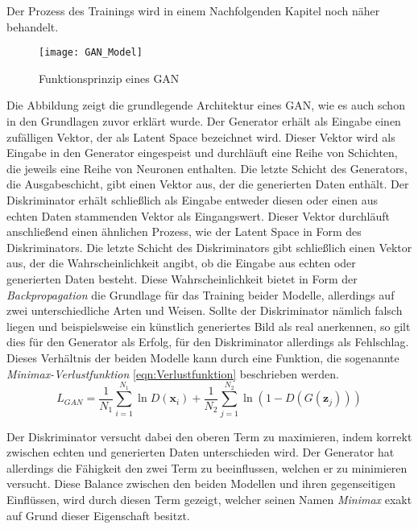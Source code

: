 \noindent Der Prozess des Trainings wird in einem Nachfolgenden Kapitel noch näher behandelt. 

\newpage

\begin{figure}[h]
    \centering
    \texttt{[image: GAN\_Model]}
    \caption{Funktionsprinzip eines \ac{GAN}}
    \label{Abb:basic}
    \end{figure}

    \noindent Die Abbildung zeigt die grundlegende Architektur eines \ac{GAN}, wie es auch schon in den Grundlagen zuvor erklärt wurde. Der Generator erhält als Eingabe einen zufälligen Vektor, der als Latent Space bezeichnet wird. Dieser Vektor wird als Eingabe in den Generator eingespeist und durchläuft eine Reihe von Schichten, die jeweils eine Reihe von Neuronen enthalten. Die letzte Schicht des Generators, die Ausgabeschicht, gibt einen Vektor aus, der die generierten Daten enthält. Der Diskriminator erhält schließlich als Eingabe entweder diesen oder einen aus echten Daten stammenden Vektor als Eingangswert. Dieser Vektor durchläuft anschließend einen ähnlichen Prozess, wie der Latent Space in Form des Diskriminators. Die letzte Schicht des Diskriminators gibt schließlich einen Vektor aus, der die Wahrscheinlichkeit angibt, ob die Eingabe aus echten oder generierten Daten besteht. Diese Wahrscheinlichkeit bietet in Form der \textit{Backpropagation} die Grundlage für das Training beider Modelle, allerdings auf zwei unterschiedliche Arten und Weisen. Sollte der Diskriminator nämlich falsch liegen und beispielsweise ein künstlich generiertes Bild als real anerkennen, so gilt dies für den Generator als Erfolg, für den Diskriminator allerdings als Fehlschlag. Dieses Verhältnis der beiden Modelle kann durch eine Funktion, die sogenannte \textit{Minimax-Verlustfunktion} \ref{eqn:Verlustfunktion} beschrieben werden.\\

    \begin{equation}
        \label{eqn:Verlustfunktion}
        L_{GAN}=\frac{1}{N_1}\sum_{i=1}^{N_1} \ln{D (\textbf{x}_i)} + \frac{1}{N_2}\sum_{j=1}^{N_2} \ln{(1-D (G (\textbf{z}_j)))}
        \end{equation}

    \noindent Der Diskriminator versucht dabei den oberen Term zu maximieren, indem korrekt zwischen echten und generierten Daten unterschieden wird. Der Generator hat allerdings die Fähigkeit den zwei Term zu beeinflussen, welchen er zu minimieren versucht. Diese Balance zwischen den beiden Modellen und ihren gegenseitigen Einflüssen, wird durch diesen Term gezeigt, welcher seinen Namen \textit{Minimax} exakt auf Grund dieser Eigenschaft besitzt. \\

